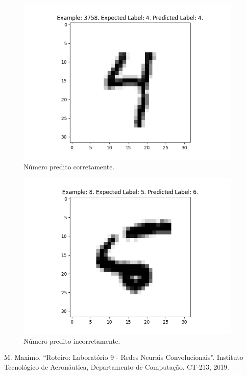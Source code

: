 \documentclass[conference]{IEEEtran}
\begin{document}
\begin{figure}[htbp]
\centering
\centerline{\includegraphics[scale=0.5]{imagens/test_image_3758.png}}
\caption{Número predito corretamente.}
\label{test_image_3758}
\end{figure}

\begin{figure}[htbp]
\centering
\centerline{\includegraphics[scale=0.5]{imagens/misclassified_image_8.png}}
\caption{Número predito incorretamente.}
\label{misclassified_image_8}
\end{figure}

\begin{thebibliography}{00}
 M. Maximo, ``Roteiro: Laboratório 9 - Redes Neurais Convolucionais''. Instituto Tecnológico de Aeronáutica, Departamento de Computação. CT-213, 2019.
\end{thebibliography}
\end{document}
